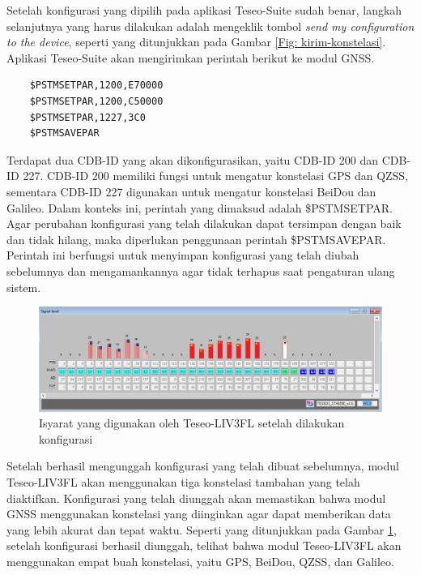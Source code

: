 Setelah konfigurasi yang dipilih pada aplikasi Teseo-Suite sudah benar, langkah selanjutnya yang harus dilakukan adalah mengeklik tombol \textit{send my configuration to the device}, seperti yang ditunjukkan pada Gambar \ref{Fig: kirim-konstelasi}. Aplikasi Teseo-Suite akan mengirimkan perintah berikut ke modul GNSS.

\begin{verbatim}
	$PSTMSETPAR,1200,E70000
	$PSTMSETPAR,1200,C50000
	$PSTMSETPAR,1227,3C0
	$PSTMSAVEPAR
\end{verbatim}

Terdapat dua CDB-ID yang akan dikonfigurasikan, yaitu CDB-ID 200 dan CDB-ID 227. CDB-ID 200 memiliki fungsi untuk mengatur konstelasi GPS dan QZSS, sementara CDB-ID 227 digunakan untuk mengatur konstelasi BeiDou dan Galileo. Dalam konteks ini, perintah yang dimaksud adalah \$PSTMSETPAR. Agar perubahan konfigurasi yang telah dilakukan dapat tersimpan dengan baik dan tidak hilang, maka diperlukan penggunaan perintah \$PSTMSAVEPAR. Perintah ini berfungsi untuk menyimpan konfigurasi yang telah diubah sebelumnya dan mengamankannya agar tidak terhapus saat pengaturan ulang sistem. 

\begin{figure}[H]
	\centering
	\includegraphics[width=14cm]{contents/chapter-3/setting-konstelasi/setelah-konfigurasi.png}
	\caption{Isyarat yang digunakan oleh Teseo\hyp{}LIV3FL setelah dilakukan konfigurasi}
	\label{Fig: setelah-konfigurasi}
\end{figure}

Setelah berhasil mengunggah konfigurasi yang telah dibuat sebelumnya, modul Teseo\hyp{}LIV3FL akan menggunakan tiga konstelasi tambahan yang telah diaktifkan. Konfigurasi yang telah diunggah akan memastikan bahwa modul GNSS menggunakan konstelasi yang diinginkan agar dapat memberikan data yang lebih akurat dan tepat waktu. Seperti yang ditunjukkan pada Gambar \ref{Fig: setelah-konfigurasi}, setelah konfigurasi berhasil diunggah, telihat bahwa modul Teseo\hyp{}LIV3FL akan menggunakan empat buah konstelasi, yaitu GPS, BeiDou, QZSS, dan Galileo. 

